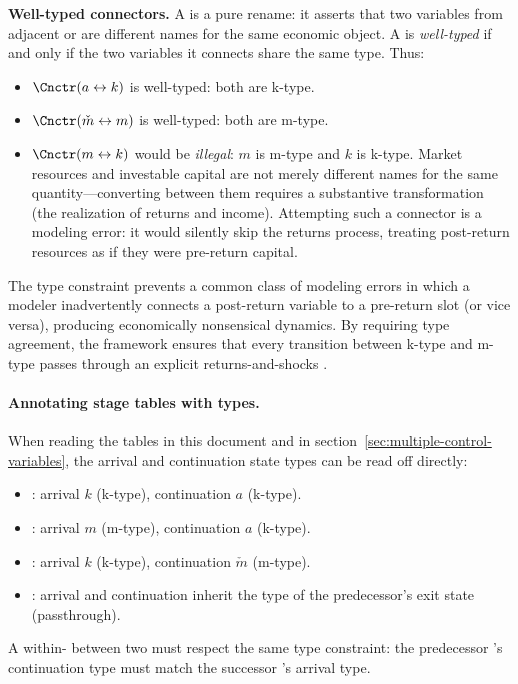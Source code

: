 \documentclass[titlepage, headings=optiontotocandhead]{econark}
\begin{document}
\noindent \textbf{Well-typed connectors.}
A {\Cnct} is a pure rename: it asserts that two variables from adjacent
{\stgs} or {\intervals} are different names for the same economic object.
A {\Cnct} is \textit{well-typed} if and only if the two variables it
connects share the same type. Thus:
\begin{itemize}
  \item $\Cnctr(a \leftrightarrow k)$ is well-typed: both are
    k-type.
  \item $\Cnctr(\check{m} \leftrightarrow m)$ is well-typed:
    both are m-type.
  \item $\Cnctr(m \leftrightarrow k)$ would be \textit{illegal}:
    $m$ is m-type and $k$ is k-type. Market resources and
    investable capital are not merely different names for the same
    quantity---converting between them requires a substantive
    transformation (the realization of returns and income). Attempting
    such a connector is a modeling error: it would silently skip the
    returns process, treating post-return resources as if they were
    pre-return capital.
\end{itemize}

\noindent The type constraint prevents a common class of modeling errors
in which a modeler inadvertently connects a post-return variable to a
pre-return slot (or vice versa), producing economically nonsensical
dynamics. By requiring type agreement, the framework ensures that every
transition between k-type and m-type passes through an explicit
returns-and-shocks {\stg}.

\paragraph{Annotating stage tables with types.}
When reading the {\prch} tables in this document and in
section~\ref{sec:multiple-control-variables}, the arrival and continuation
state types can be read off directly:
\begin{itemize}
  \item {}: arrival $k$ (k-type),
    continuation $a$ (k-type).
  \item {}: arrival $m$ (m-type),
    continuation $a$ (k-type).
  \item {}: arrival $k$ (k-type),
    continuation $\check{m}$ (m-type).
  \item {}: arrival and continuation inherit the type of
    the predecessor's exit state (passthrough).
\end{itemize}
A within-{\interval} {\Cnct} between two {\stgs} must respect the same
type constraint: the predecessor {\stg}'s continuation type must match
the successor {\stg}'s arrival type.
\end{document}
